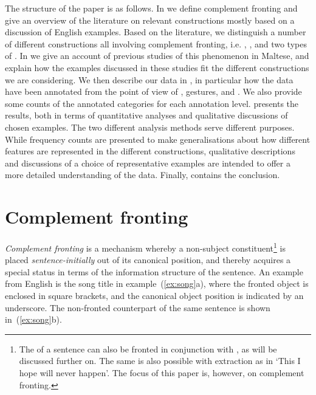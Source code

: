 \documentclass[output=paper]{LSP/langsci}
\begin{document}
The structure of the paper is as follows. In
 we define complement fronting and
give an overview of the literature on relevant constructions mostly
based on a discussion of English examples.
Based on the literature, we distinguish a number of different
constructions all involving complement fronting, i.e. ,
, and two types of .  In
 we give an account of previous studies
of this phenomenon in Maltese, and explain how the examples discussed
in these studies fit the different constructions we are considering.  We
then describe our data in , in particular
how the data have been annotated from the point of view of ,
gestures, and . We also provide some counts of the
annotated categories for each annotation level.
presents the results, both in terms of quantitative analyses and
qualitative discussions of chosen examples.
The two different analysis methods serve different purposes. While
frequency counts are presented to make generalisations about how
different features are represented in the different constructions,
qualitative descriptions and discussions of a choice of
representative examples are intended to offer a more detailed
understanding of the data.
Finally,  contains the conclusion.

\newpage 
\section{Complement fronting}
\label{section:fronting}

\largerpage
{\em Complement fronting} is a  mechanism whereby a
non-subject constit\-u\-ent\footnote{The  of a sentence can also be
  fronted in conjunction with , as will be discussed
  further on. The same is also possible with  extraction as in
  `This I hope will never happen'. The focus of this paper is,
  however, on complement fronting.} is placed {\em sentence-initially}
out of its canonical position, and thereby acquires a special status
in terms of the information structure of the sentence. An example from
English is the song title in example~(\ref{ex:song}a), where the
fronted object is enclosed in square brackets, and the canonical
object position is indicated by an underscore. The non-fronted
counterpart of the same sentence is shown in~(\ref{ex:song}b).
\end{document}
